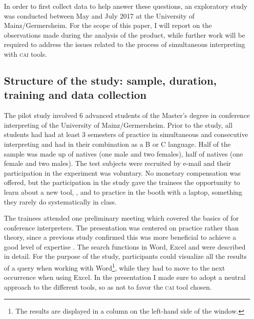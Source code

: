 \documentclass[output=paper]{langsci/langscibook}
\begin{document}
In order to first collect data to help answer these questions, an exploratory study was conducted between May and July 2017 at the University of Mainz\slash Germersheim. For the scope of this paper, I will report on the observations made during the analysis of the product, while further work will be required to address the issues related to the process of simultaneous interpreting with \textsc{cai} tools.

\subsection{Structure of the study: sample, duration, training and data collection}\label{sec:prandi:3.3}
The pilot study involved 6 advanced students of the Master’s degree in conference interpreting of the University of Mainz\slash Germersheim. Prior to the study, all students had had at least 3 semesters of practice in simultaneous and consecutive interpreting and had  in their combination as a B or C language. Half of the sample was made up of  natives (one male and two females), half of  natives (one female and two males). The test subjects were recruited by e-mail and their participation in the experiment was voluntary. No monetary compensation was offered, but the participation in the study gave the trainees the opportunity to learn about a new tool, , and to practice in the booth with a laptop, something they rarely do systematically in class.

The trainees attended one preliminary meeting which covered the basics of  for conference interpreters. The presentation was centered on practice rather than theory, since a previous study confirmed this was more beneficial to achieve a good level of expertise \citep{Prandi2015a, Prandi2015b}. The search functions in Word, Excel and  were described in detail. For the purpose of the study, participants could visualize all the results of a query when working with Word\footnote{The results are displayed in a column on the left-hand side of the window.}, while they had to move to the next occurrence when using Excel. In the presentation I made sure to adopt a neutral approach to the different tools, so as not to favor the \textsc{cai} tool chosen.
\end{document}
